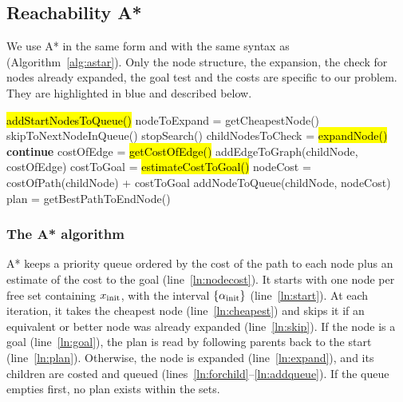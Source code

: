 \subsection{Reachability A*}
\label{sec:method:search}
We use A* in the same form and with the same syntax
as~\cite{griffin2019footstep,wang2026cassr} (Algorithm~\ref{alg:astar}).
Only the node structure, the expansion, the check for nodes already expanded,
the goal test and the costs are specific to our problem. They are highlighted
in blue and described below.

\begin{algorithm}[t]
\caption{A* search; the parts specific to our problem are in blue}
\label{alg:astar}
\begin{algorithmic}[1]
\State \hl{addStartNodesToQueue()} \label{ln:start} 
  \State nodeToExpand = getCheapestNode() \label{ln:cheapest}
   \label{ln:skip} 
    \State skipToNextNodeInQueue()
  \EndIf
   \label{ln:goal}
    \State stopSearch()
  \EndIf
  \State childNodesToCheck = \hl{expandNode()} \label{ln:expand} 
   \label{ln:forchild}
     \label{ln:skipchild}
      \State \textbf{continue} 
    \EndIf
    \State costOfEdge = \hl{getCostOfEdge()} 
    \State addEdgeToGraph(childNode, costOfEdge)
    \State costToGoal = \hl{estimateCostToGoal()} 
    \State nodeCost = costOfPath(childNode) + costToGoal \label{ln:nodecost}
    \State addNodeToQueue(childNode, nodeCost) \label{ln:addqueue}
  \EndFor
\EndWhile
\State plan = getBestPathToEndNode() \label{ln:plan} 
\end{algorithmic}
\end{algorithm}

\subsubsection{The A* algorithm}
\label{sec:astar:astar}
A* keeps a priority queue ordered by the cost of the path to each node plus
an estimate of the cost to the goal (line~\ref{ln:nodecost}). It starts with
one node per free set containing $x_{\mathrm{init}}$, with the interval $\{\alpha_{\mathrm{init}}\}$
(line~\ref{ln:start}). At each iteration, it takes the cheapest node
(line~\ref{ln:cheapest}) and skips it if an equivalent or better node was
already expanded (line~\ref{ln:skip}). If the node is a goal
(line~\ref{ln:goal}), the plan is read by following parents back to the start
(line~\ref{ln:plan}). Otherwise, the node is expanded (line~\ref{ln:expand}),
and its children are costed and queued
(lines~\ref{ln:forchild}--\ref{ln:addqueue}). If the queue empties first, no
plan exists within the sets.

